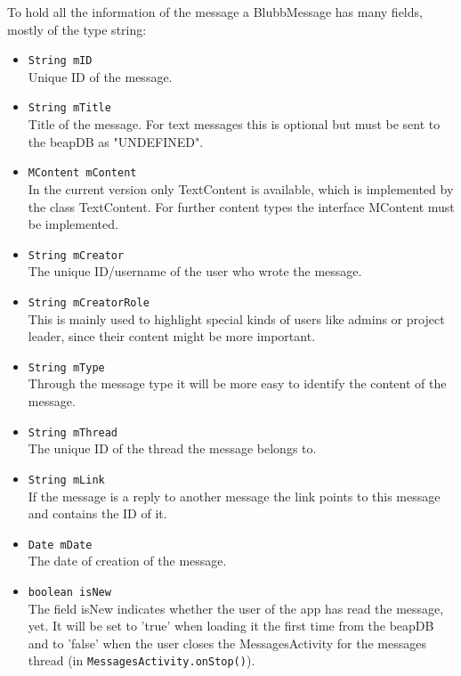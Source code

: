 \documentclass[12pt,a4paper,oneside]{report}
\newcommand{\beapDB}{beapDB}
\newcommand{\code}[1]{\lstinline{#1}}
\begin{document}
To hold all the information of the message a BlubbMessage has many fields, mostly of the type string: 
\begin{itemize}
\item \code{String mID}\\
Unique ID of the message.
\item \code{String mTitle}\\
Title of the message. For text messages this is optional but must be sent to the \beapDB{} as "UNDEFINED".
\item \code{MContent mContent}\\
In the current version only TextContent is available, which is implemented by the class TextContent. For further content types the interface MContent must be implemented. 
\item \code{String mCreator}\\
The unique ID/username of the user who wrote the message.
\item \code{String mCreatorRole}\\
This is mainly used to highlight special kinds of users like admins or project leader, since their content might be more important.
\item \code{String mType}\\
Through the message type it will be more easy to identify the content of the message.
\item \code{String mThread}\\
The unique ID of the thread the message belongs to.
\item \code{String mLink}\\
If the message is a reply to another message the link points to this message and contains the ID of it.
\item \code{Date mDate}\\
The date of creation of the message. 
\item \code{boolean isNew}\\
The field isNew indicates whether the user of the app has read the message, yet. It will be set to 'true' when loading it the first time from the \beapDB{} and to 'false' when the user closes the MessagesActivity for the messages thread (in \code{MessagesActivity.onStop()}). 

\end{itemize}
\end{document}
